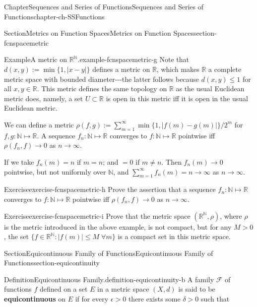 \documentclass[oneside,10pt,]{book}
\newcommand{\terminology}[1]{\textbf{#1}}
\numberwithin{equation}{section}
\newcommand{\bbR}{\mathbb{R}}
\newcommand{\bbN}{\mathbb{N}}
\begin{document}
\begin{chapterptx}{Chapter}{Sequences and Series of Functions}{}{Sequences and Series of Functions}{}{}{chapter-ch-SSFunctions}
\begin{sectionptx}{Section}{Metrics on Function Spaces}{}{Metrics on Function Spaces}{}{}{section-fcnspacemetric}
\begin{example}{Example}{A metric on \(\bbR^{\bbN}\).}{example-fcnspacemetric-g}%
Note that \(d(x, y) :=\min\{1, |x-y|\}\) defines a metric on \(\bbR\), which makes \(\bbR\) a complete metric space with bounded diameter-{}-{}-the latter follows because \(d(x, y)\le 1\) for all \(x, y\in \bbR\). This metric defines  the same topology on \(\bbR\) as the usual Euclidean metric does, namely, a set \(U\subset \bbR\) is open in this metric iff it is open in the usual Euclidean metric.%
\par
We can define a metric \(\rho(f, g) :=\sum_{m=1}^{\infty}\min\{1, |f(m)-g(m)|\}/2^{m}\) for \(f, g: \bbN\mapsto \bbR\). A sequence \(f_{n}:\bbN\mapsto \bbR\) converges to \(f:\bbN\mapsto \bbR\) pointwise iff \(\rho(f_{n}, f)\to 0\) as \(n\to \infty\).%
\par
If we take  \(f_{n}(m)=n\) if \(m=n\); and \(=0\) if \(m\neq n\). Then \(f_{n}(m)\to 0\) pointwise, but not uniformly over \(\bbN\), and \(\sum_{m=1}^{\infty}f_{n}(m)=n
\to \infty\) as \(n\to \infty\).%
\end{example}
\begin{inlineexercise}{Exercise}{}{exercise-fcnspacemetric-h}%
Prove the assertion that a sequence \(f_{n}:\bbN\mapsto \bbR\) converges to \(f:\bbN\mapsto \bbR\) pointwise iff \(\rho(f_{n}, f)\to 0\) as \(n\to \infty\).%
\end{inlineexercise}%
\begin{inlineexercise}{Exercise}{}{exercise-fcnspacemetric-i}%
Prove that the metric space  \((\bbR^{\bbN}, \rho)\), where \(\rho\) is the metric introduced in the above example, is not compact, but for any \(M > 0\), the set \(\{f\in \bbR^{\bbN}: |f(m)|\le M\; \forall m \} \) is a compact set in this metric space.%
\end{inlineexercise}%
\end{sectionptx}
%
%
\typeout{************************************************}
\typeout{************************************************}
%
\begin{sectionptx}{Section}{Equicontinuous Family of Functions}{}{Equicontinuous Family of Functions}{}{}{section-equicontinuity}
\begin{definition}{Definition}{Equicontinuous Family.}{definition-equicontinuity-b}%
A family \(\mathcal F\) of functions \(f\) defined on a set \(E\) in a metric space \((X, d)\) is said to be \terminology{equicontinuous} on \(E\) if for every \(\epsilon > 0\) there exists some \(\delta > 0\) such that%

\end{definition}
\end{sectionptx}
\end{chapterptx}
\end{document}
